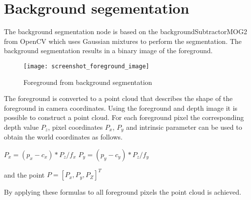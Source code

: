 \section*{Background segementation}

The background segmentation node is based on the backgroundSubtractorMOG2 from OpenCV \cite{BGS} which uses Gaussian mixtures to perform the segmentation. The background segmentation results in a binary image of the foreground. 

\begin{figure}[H]
\begin{center}
\texttt{[image: screenshot\_foreground\_image]}
\caption{Foreground from background segmentation}
\label{tracking}
\end{center}
\end{figure}

The foreground is converted to a point cloud that describes the shape of the foreground in camera coordinates. Using the foreground and depth image it is possible to construct a point cloud. For each foreground pixel the corresponding depth value $P_z$, pixel coordinates $P_x$, $P_y$ and intrinsic parameter can be used to obtain the world coordinates as follows.

$P_x = (p_x - c_x) * P_z / f_x$
$P_y = (p_y - c_y) * P_z / f_y$

and the point $P = [P_x, P_y, P_Z]^T$

By applying these formulas to all foreground pixels the point cloud is achieved.


